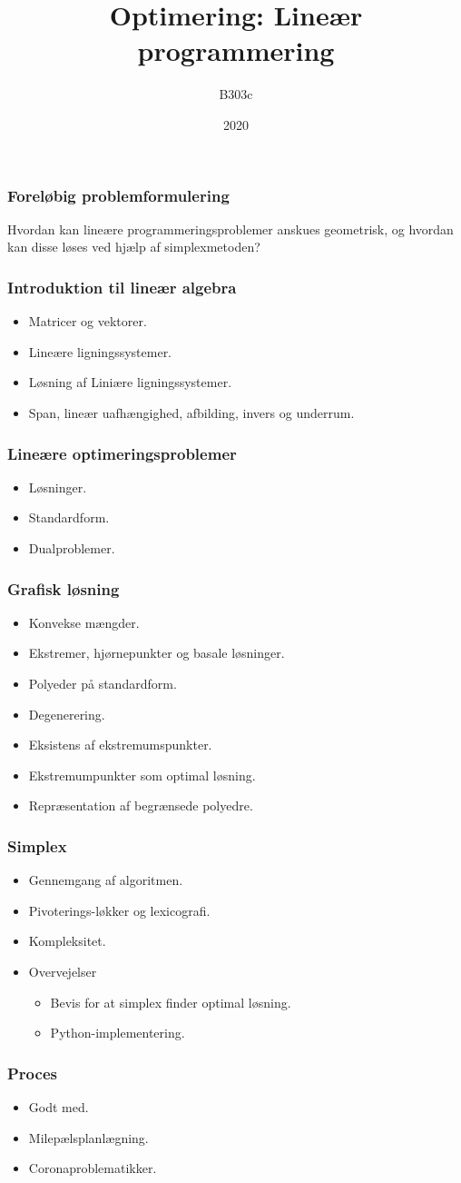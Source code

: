 \documentclass{beamer}
\title{Optimering: Lineær programmering}
\author{B303c}
\institute{Aalborg Universitet}
\date{2020}
\begin{document}
\frame{\titlepage}


\begin{frame}
\frametitle{Foreløbig problemformulering}
Hvordan kan lineære programmeringsproblemer anskues geometrisk, og hvordan kan disse løses ved hjælp af simplexmetoden?
\end{frame}
\begin{frame}
\frametitle{Introduktion til lineær algebra}
\begin{itemize}
\item Matricer og vektorer.
\item Lineære ligningssystemer.
\item Løsning af Liniære ligningssystemer.
\item Span, lineær uafhængighed, afbilding, invers og underrum.
\end{itemize}
\end{frame}


\begin{frame}
\frametitle{Lineære optimeringsproblemer}
\begin{itemize}
\item Løsninger.
\item Standardform.
\item Dualproblemer.
\end{itemize}
\end{frame}


\begin{frame}
\frametitle{Grafisk løsning}
\begin{itemize}
\item Konvekse mængder.
\item Ekstremer, hjørnepunkter og basale løsninger.
\item Polyeder på standardform.
\item Degenerering.
\item Eksistens af ekstremumspunkter. %
\item Ekstremumpunkter som optimal løsning.
\item Repræsentation af begrænsede polyedre.
\end{itemize}
\end{frame}

\begin{frame}
\frametitle{Simplex}
\begin{itemize}
\item Gennemgang af algoritmen.
\item Pivoterings-løkker og lexicografi.
\item Kompleksitet.
\item Overvejelser
\begin{itemize}
\item Bevis for at simplex finder optimal løsning.
\item Python-implementering.
\end{itemize}
\end{itemize}
\end{frame}


\begin{frame}
\frametitle{Proces}
\begin{itemize}
\item Godt med.
\item Milepælsplanlægning.
\item Coronaproblematikker.
\end{itemize}
\end{frame}
\end{document}
